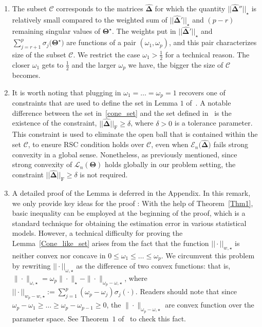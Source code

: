 \documentclass[alpha-refs]{wiley-article}
\begin{document}
\begin{enumerate}
    \item The subset $\mathcal{C}$ corresponds to the matrices $\boldsymbol{\widehat{\Delta}}$ for which the quantity $||\boldsymbol{\widehat{\Delta}}''||_{\star}$ is relatively small compared to the weighted sum of $||\boldsymbol{\widehat{\Delta}}'||_{\star}$ and $(p-r)$ remaining singular values of $\boldsymbol{\Theta}^{\star}$.
    The weights put in $||\boldsymbol{\widehat{\Delta}}'||_{\star}$ and $\sum_{j=r+1}^{p}\sigma_{j}\big(\boldsymbol{\Theta^{\star}}\big)$ are functions of a pair $(\omega_{1},\omega_{p})$, and this pair characterizes size of the subset $\mathcal{C}$.
    We restrict the case $\omega_{1} > \frac{1}{2}$ for a technical reason.
    The closer $\omega_{1}$ gets to $\frac{1}{2}$ and the larger $\omega_{p}$ we have, the bigger the size of $\mathcal{C}$  becomes.

    \item It is worth noting that plugging in $\omega_{1}=\dots=\omega_{p}=1$ recovers one of constraints that are used to define the set in Lemma $1$ of~\citet{negahban2011estimation}.
    A notable difference between the set in~\eqref{cone_set} and the set defined in~\citet{negahban2011estimation} is the existence of the constraint, $||\boldsymbol{\widehat{\Delta}}||_{\text{F}} \geq \delta$, where $\delta>0$ is a tolerance parameter.
    This constraint is used to eliminate the open ball that is contained within the set $\mathcal{C}$, to ensure RSC condition holds over $\mathcal{C}$, even when $\mathcal{E}_{n}\big(\boldsymbol{\widehat{\Delta}})$ fails strong convexity in a global sense.
    Nonetheless, as previously mentioned, since strong convexity of $\mathcal{L}_{n}(\boldsymbol{\Theta})$ holds globally in our problem setting, the constraint $||\boldsymbol{\widehat{\Delta}}||_{\text{F}} \geq \delta$ is not required.

    \item A detailed proof of the Lemma is deferred in the Appendix.
    In this remark, we only provide key ideas for the proof :
    With the help of Theorem~\ref{Thm1}, basic inequality can be employed at the beginning of the proof,
    which is a standard technique for obtaining the estimation error in various statistical models.
    However, a technical difficulty for proving the Lemma~\ref{Cone_like_set} arises from the fact that the function $|| \cdot ||_{w,\star}$ is neither convex nor concave in $0\leq \omega_{1}\leq\dots \leq \omega_{p}$.
    We circumvent this problem by rewriting $|| \cdot ||_{\omega,\star}$ as the difference of two convex functions: that is,
    $\| \cdot \|_{\omega,\star} = \omega_{p} \| \cdot \|_{\star} - \| \cdot \|_{\omega_{p}-\omega,\star}$,
    where $|| \cdot ||_{w_{p}-w,\star}:=\sum_{j=1}^{p}(\omega_{p}-\omega_{j})\sigma_{j}(\cdot)$.
    Readers should note that since $\omega_{p}-\omega_{1} \geq \dots \geq \omega_{p}-\omega_{p-1}\geq 0$, the $\| \cdot \|_{\omega_{p}-\omega,\star}$ are convex function over the parameter space.
    See Theorem~$1$ of~\cite{chen2013reduced} to check this fact.
\end{enumerate}
\end{document}
